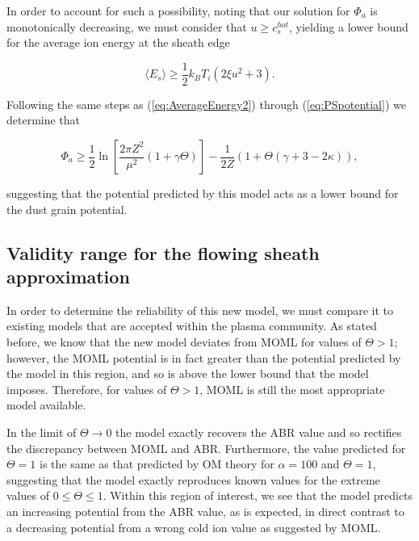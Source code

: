 \documentclass{article}
\begin{document}
\medskip

In order to account for such a possibility, noting that our solution
for $\Phi_a$ is monotonically decreasing, we must consider that
$u \geq c_s^{hot}$, yielding a lower bound for the average ion energy at the sheath edge

\begin{equation}\label{eq:AverageEnergy}
\langle E_{s} \rangle \geq \frac{1}{2}k_B T_i \left(2\xi u^2 + 3\right).
\end{equation}

\medskip

Following the same steps as (\ref{eq:AverageEnergy2}) through (\ref{eq:PSpotential}) we determine that

\begin{equation}\label{eq:LowerBound}
\Phi_a \geq  \frac{1}{2}\ln{\left[\frac{2\pi Z^2}{\mu^2}(1 + \gamma \Theta)\right]} - \frac{1}{2Z}\left(1 + \Theta\left(\gamma + 3 -2\kappa\right)\right),
\end{equation}

\smallskip

\noindent suggesting that the potential predicted by this model acts as a lower bound for the dust grain potential.

\subsection{Validity range for the flowing sheath approximation}

\smallskip

In order to determine the reliability of this new model, we must compare it to existing 
models that are accepted within the plasma community. As stated before, we know that 
the new model deviates from MOML for values of $\Theta > 1$; however, the MOML potential 
is in fact greater than the potential predicted by the model in this region, and so is above
the lower bound that the model imposes. Therefore, for values of $\Theta > 1$, MOML is still the most
appropriate model available. 

\medskip

In the limit of 
$\Theta \to 0$ the model exactly recovers the ABR value and so rectifies the discrepancy between
MOML and ABR. Furthermore, the value predicted for 
$\Theta = 1$ is the same as that predicted by OM theory for $\alpha = 100$ and $\Theta = 1$, suggesting 
that the model exactly reproduces known values for the extreme values of $0 \leq \Theta \leq 1$.
Within this region of interest, we see that the model predicts an 
increasing potential from the ABR value, as is expected, in direct contrast to a decreasing potential from a 
wrong cold ion value as suggested by MOML.
\end{document}
